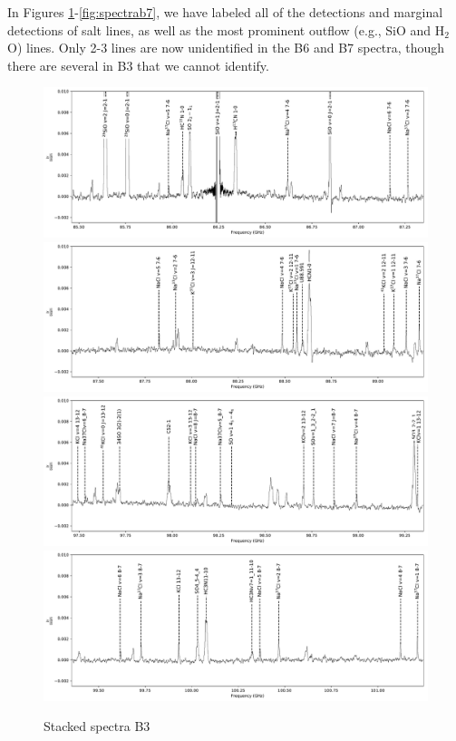 \documentclass[twocolumn]{aastex62}
\begin{document}
In Figures \ref{fig:spectrab3}-\ref{fig:spectrab7}, we have labeled all of the
detections and marginal detections of salt lines, as well as the most
prominent outflow (e.g., SiO and H$_2$O) lines.  Only 2-3 lines are now
unidentified in the B6 and B7 spectra, though there are several in B3 that
we cannot identify.

\begin{figure}[!htp]
\includegraphics[scale=1,width=5.5in]{figures/lines_labeled_OrionSourceI_B3_spw0_robust0.5.pdf}
\includegraphics[scale=1,width=5.5in]{figures/lines_labeled_OrionSourceI_B3_spw1_robust0.5.pdf}
\includegraphics[scale=1,width=5.5in]{figures/lines_labeled_OrionSourceI_B3_spw2_robust0.5.pdf}
\includegraphics[scale=1,width=5.5in]{figures/lines_labeled_OrionSourceI_B3_spw3_robust0.5.pdf}
\caption{Stacked spectra  B3}
\label{fig:spectrab3}
\end{figure}
\end{document}
